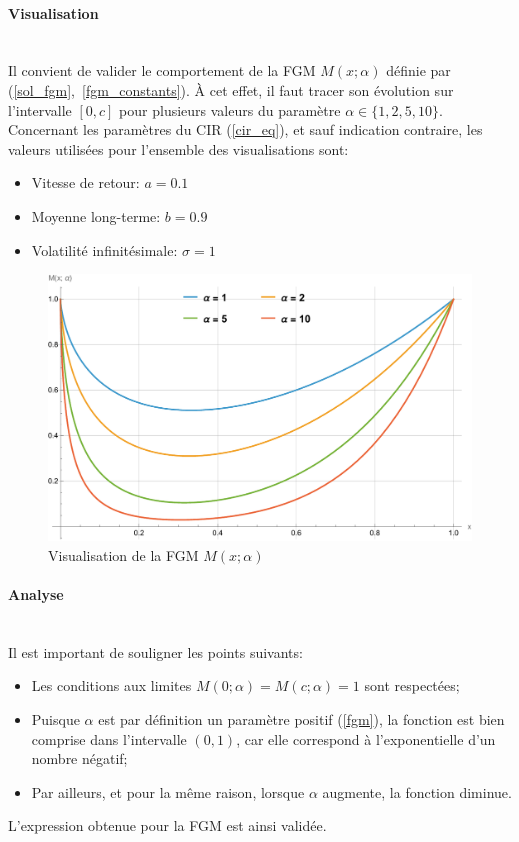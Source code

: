 \paragraph{Visualisation}\phantom{}\\
Il convient de valider le comportement de la \acl{FGM} $M(x;\alpha)$ définie par (\ref{sol_fgm},~\ref{fgm_constants}). À cet effet, il faut tracer son évolution sur l'intervalle $[0, c]$ pour plusieurs valeurs du paramètre $\alpha \in \{1, 2, 5, 10\}$. Concernant les paramètres du \acs{CIR} (\ref{cir_eq}), et sauf indication contraire, les valeurs utilisées pour l'ensemble des visualisations sont:
\begin{itemize}
    \item Vitesse de retour: \(a=0.1\)
    \item Moyenne long-terme: \(b=0.9\)
    \item Volatilité infinitésimale: \(\sigma=1\)
\end{itemize}
\begin{figure}[htb]
    \centering
    \includegraphics[width=0.5\linewidth]{img/validation/fgm.pdf}
    \caption{Visualisation de la \acl{FGM} $M(x;\alpha)$}\label{fig:FGMVisualisation}
\end{figure}
\FloatBarrier\paragraph{Analyse}\phantom{}\\
Il est important de souligner les points suivants:
\begin{itemize}
    \item Les conditions aux limites $M(0; \alpha) = M(c; \alpha) = 1$ sont respectées;
    \item Puisque $\alpha$ est par définition un paramètre positif (\ref{fgm}), la fonction est bien comprise dans l'intervalle $(0, 1)$, car elle correspond à l'exponentielle d'un nombre négatif; 
    \item Par ailleurs, et pour la même raison, lorsque $\alpha$ augmente, la fonction diminue.
\end{itemize}
L'expression obtenue pour la \acl{FGM} est ainsi validée. 

